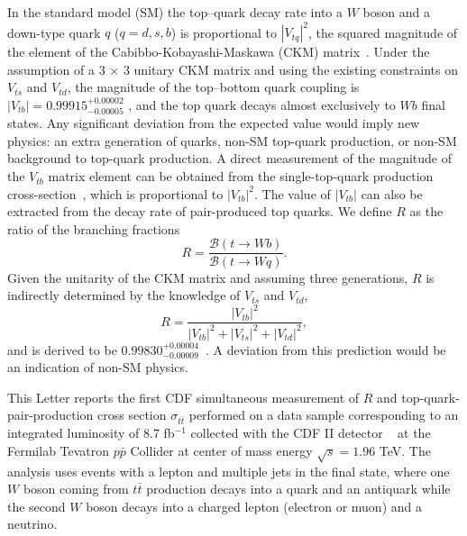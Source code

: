 \documentclass[aps,prd,twocolumn,superscriptaddress,showpacs]{revtex4}
\begin{document}
\maketitle                                                                                                                                      

In the standard model (SM) the top--quark decay rate into a $W$
boson and a down-type quark $q$ ($q = d, s, b$) is proportional to 
$\left|V_{tq}\right|^{2}$, the squared magnitude of the element of the Cabibbo-Kobayashi-Maskawa (CKM) 
matrix~\cite{CKM}. Under the assumption of a 3 $\times$ 3 unitary 
CKM matrix and using the existing constraints on $V_{ts}$ and $V_{td}$, the magnitude of the top--bottom quark coupling is
$\left |V_{tb}\right|=0.99915^{+0.00002}_{-0.00005}$ \cite{PDG, Vts}, and  the  
top quark decays almost exclusively to $Wb$ final states. 
Any significant deviation from the expected value would imply new physics: an extra generation of quarks, 
non-SM top-quark production, or non-SM background to top-quark production.
A direct measurement of the magnitude of the $V_{tb}$ matrix element can be 
obtained from    the single-top-quark production cross-section~\cite{singletop},
which is proportional to $\left|V_{tb}\right|^{2}$. The value of
$\left|V_{tb}\right|$ can also be extracted from the decay rate of pair-produced top quarks.
We define  $R$ as 
the ratio of the branching fractions
\begin{equation} 
R =\frac{\mathcal{B}(t\rightarrow Wb)}{\mathcal{B}(t\rightarrow Wq)}.
\label{eq:Rratio}
\end{equation}
Given the unitarity of the CKM matrix and assuming three generations,
$R$ is indirectly determined by the knowledge of 
$V_{ts}$ and $V_{td}$,
\begin{equation}
R = \frac{\left|V_{tb}\right|^2}{\left|V_{tb}\right|^2+\left|V_{ts}\right|^2+\left|V_{td}\right|^2}, 
\label{eq:Rratio2}
\end{equation}
and is derived to be $0.99830^{+0.00004}_{-0.00009}$~\cite{PDG}. A deviation from this prediction would be an 
indication of non-SM physics.

This Letter reports the first CDF simultaneous measurement of $R$ and 
top-quark-pair-production cross section
$\sigma_{t\bar{t}}$                                                       
performed on a data sample corresponding to an integrated luminosity of 8.7 fb$^{-1}$
 collected with the CDF II detector ~\cite{CDFII} at the Fermilab Tevatron $p\bar{p}$ Collider 
at center of mass energy $\sqrt{s}=1.96$ TeV. 
The analysis  uses events with a lepton and multiple jets in the final state,
where one $W$ boson coming from 
$t\bar t$ production  decays into a quark and an antiquark while the 
second $W$ boson decays into a charged lepton (electron or muon) and a neutrino. 
\end{document}
